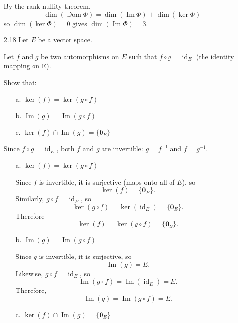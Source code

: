 \documentclass[11pt]{article}
\newcommand{\vect}[1]{\bm{#1}}      %
\DeclareMathOperator{\Img}{Im}
\DeclareMathOperator{\Dom}{Dom}
\DeclareMathOperator{\id}{id}
\theoremstyle{definition}
\theoremstyle{plain}
\theoremstyle{remark}
\begin{document}
\begin{enumerate}
          By the rank-nullity theorem,
          \[
              \dim(\Dom \Phi) = \dim(\Img \Phi) + \dim(\ker \Phi)
          \]
          so $\dim(\ker \Phi) = 0$ gives $\dim(\Img \Phi) = 3$.

          \pagebreak

    \item[2.18] Let $E$ be a vector space.

          Let $f$ and $g$ be two automorphisms on $E$ such that $f \circ g = \id_E$ (the identity mapping on E).

          Show that:
          \begin{enumerate}
              \item[a.] $\ker(f) = \ker(g \circ f)$
              \item[b.] $\Img(g) = \Img(g \circ f)$
              \item[c.] $\ker(f) \cap \Img(g) = \{ \vect{0}_E \}$
          \end{enumerate}

          Since $f \circ g = \id_E$, both $f$ and $g$ are invertible: $g = f^{-1}$ and $f = g^{-1}$.

          \begin{enumerate}
              \item[a.] $\ker(f) = \ker(g \circ f)$

                    Since $f$ is invertible, it is surjective (maps onto all of $E$), so
                    \[
                        \ker(f) = \{ \vect{0}_E \}.
                    \]
                    Similarly, $g \circ f = \id_E$, so
                    \[
                        \ker(g \circ f) = \ker(\id_E) = \{ \vect{0}_E \}.
                    \]
                    Therefore
                    \[
                        \ker(f) = \ker(g \circ f) = \{ \vect{0}_E \}.
                    \]

              \item[b.] $\Img(g) = \Img(g \circ f)$

                    Since $g$ is invertible, it is surjective, so
                    \[
                        \Img(g) = E.
                    \]
                    Likewise, $g \circ f = \id_E$, so
                    \[
                        \Img(g \circ f) = \Img(\id_E) = E.
                    \]
                    Therefore,
                    \[
                        \Img(g) = \Img(g \circ f) = E.
                    \]

              \item[c.] $\ker(f) \cap \Img(g) = \{ \vect{0}_E \}$


\end{enumerate}
\end{enumerate}
\end{document}
